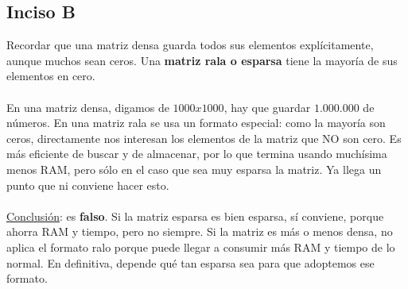 \documentclass{article}
\begin{document}
        \subsection*{Inciso B}
            Recordar que una matriz densa guarda todos sus elementos explícitamente, aunque muchos sean ceros. Una \textbf{matriz rala o esparsa} tiene la mayoría de sus elementos en cero. \\
            \\
            En una matriz densa, digamos de $1000 x 1000$, hay que guardar $1.000.000$ de números. En una matriz rala se usa un formato especial: como la mayoría son ceros, directamente nos interesan los elementos de la matriz que NO son cero. Es más eficiente de buscar y de almacenar, por lo que termina usando muchísima menos RAM, pero sólo en el caso que sea muy esparsa la matriz. Ya llega un punto que ni conviene hacer esto. \\
            \\
            \underline{Conclusión}: es \textbf{falso}. Si la matriz esparsa es bien esparsa, sí conviene, porque ahorra RAM y tiempo, pero no siempre. Si la matriz es más o menos densa, no aplica el formato ralo porque puede llegar a consumir más RAM y tiempo de lo normal. En definitiva, depende qué tan esparsa sea para que adoptemos ese formato.
\end{document}
